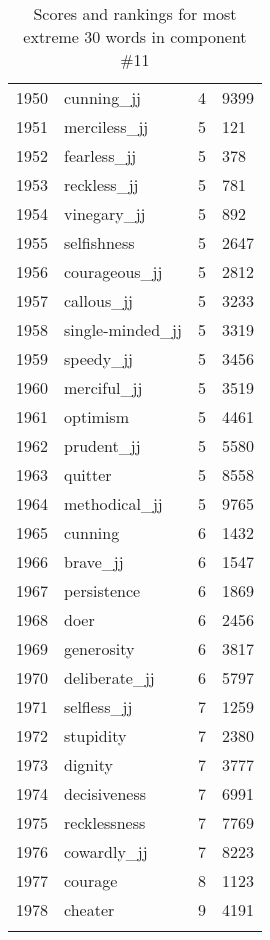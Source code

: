 \begin{longtable}[!htbp]{| rlr@{.}l |}
    1950 & cunning\_jj & 4 & 9399 \\
    1951 & merciless\_jj & 5 & 121 \\
    1952 & fearless\_jj & 5 & 378 \\
    1953 & reckless\_jj & 5 & 781 \\
    1954 & vinegary\_jj & 5 & 892 \\
    1955 & selfishness & 5 & 2647 \\
    1956 & courageous\_jj & 5 & 2812 \\
    1957 & callous\_jj & 5 & 3233 \\
    1958 & single-minded\_jj & 5 & 3319 \\
    1959 & speedy\_jj & 5 & 3456 \\
    1960 & merciful\_jj & 5 & 3519 \\
    1961 & optimism & 5 & 4461 \\
    1962 & prudent\_jj & 5 & 5580 \\
    1963 & quitter & 5 & 8558 \\
    1964 & methodical\_jj & 5 & 9765 \\
    1965 & cunning & 6 & 1432 \\
    1966 & brave\_jj & 6 & 1547 \\
    1967 & persistence & 6 & 1869 \\
    1968 & doer & 6 & 2456 \\
    1969 & generosity & 6 & 3817 \\
    1970 & deliberate\_jj & 6 & 5797 \\
    1971 & selfless\_jj & 7 & 1259 \\
    1972 & stupidity & 7 & 2380 \\
    1973 & dignity & 7 & 3777 \\
    1974 & decisiveness & 7 & 6991 \\
    1975 & recklessness & 7 & 7769 \\
    1976 & cowardly\_jj & 7 & 8223 \\
    1977 & courage & 8 & 1123 \\
    1978 & cheater & 9 & 4191 \\
    \hline
    \caption{Scores and rankings for most extreme 30 words in component \#11} \\
\end{longtable}
